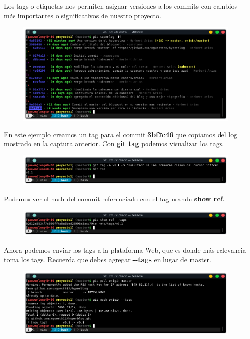 \documentclass{article}
\begin{document}
Los tags o etiquetas nos permiten asignar versiones a los commits con cambios
más importantes o significativos de nuestro proyecto.

\begin{figure}[h!]
  \centering
  \includegraphics[scale=0.75]{./Pictures/236_superlog.png}
\end{figure}

\newpage

En este ejemplo creamos un tag para el commit \textbf{3bf7c46} que copiamos del
log mostrado en la captura anterior. Con \textbf{git tag} podemos visualizar
los tags.

\begin{figure}[h!]
  \centering
  \includegraphics[scale=0.75]{./Pictures/237_gittag.png}
\end{figure}

Podemos ver el hash del commit referenciado con el tag usando
\textbf{show-ref}.

\begin{figure}[h!]
  \centering
  \includegraphics[scale=0.75]{./Pictures/237_showref_tags.png}
\end{figure}

Ahora podemos enviar los tags a la plataforma Web, que es donde más relevancia
toma los tags. Recuerda que debes agregar \textbf{{-}{-}tags} en lugar de
master.

\begin{figure}[h!]
  \centering
  \includegraphics[scale=0.75]{./Pictures/238_push_tags.png}
\end{figure}
\end{document}
